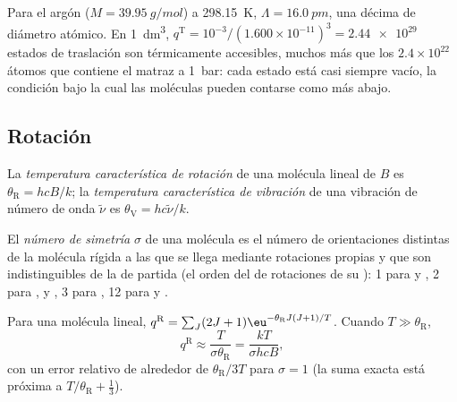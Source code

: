 \begin{example}\label{ex:b3:partition-functions:argon}
Para el argón ($M = \qty{39.95}{g/mol}$) a \qty{298.15}{K}, $\Lambda = \qty{16.0}{pm}$, una décima de
diámetro atómico. En \qty{1}{dm^3}, $q^{\mathrm T} = 10^{-3}/(1.600\times10^{-11})^3 = \num{2.44e29}$
estados de traslación son térmicamente accesibles, muchos más que los
$2.4\times10^{22}$ átomos que contiene el matraz a \qty{1}{bar}: cada estado está casi siempre
vacío, la condición bajo la cual las moléculas pueden contarse como más abajo.
\end{example}

\subsection*{Rotación}

\begin{definition}\label{def:b3:partition-functions:characteristic-temperature}
La \emph{temperatura característica de rotación}
de una molécula lineal de  $B$ es $\theta_{\mathrm R} =
hcB/k$; la \emph{temperatura característica de vibración}
de una vibración de número de onda $\tilde\nu$ es $\theta_{\mathrm V} =
hc\tilde\nu/k$.
\end{definition}

\begin{definition}\label{def:b3:partition-functions:symmetry-number}
El \emph{número de simetría} $\sigma$ de una molécula es el
número de orientaciones distintas de la molécula rígida a las que se llega mediante
rotaciones propias y que son indistinguibles de la de partida (el orden del
 de rotaciones de su ): 1 para  y , 2 para ,
 y , 3 para , 12 para  y .
\end{definition}

\begin{proposition}\label{prop:b3:partition-functions:q-rot}
Para una molécula lineal, $q^{\mathrm R} = \sum_J(2J+1)\eu^{-\theta_{\mathrm R}J(J+1)/T}$. Cuando $T \gg
\theta_{\mathrm R}$,
\[
  q^{\mathrm R} \approx \frac{T}{\sigma\theta_{\mathrm R}} = \frac{kT}{\sigma hcB},
\]
con un error relativo de alrededor de $\theta_{\mathrm R}/3T$ para $\sigma = 1$ (la suma exacta está próxima
a $T/\theta_{\mathrm R} + \frac13$).
\end{proposition}

